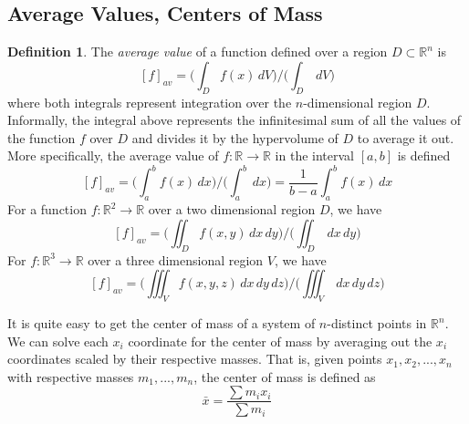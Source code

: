 \documentclass{article}
\theoremstyle{remark}
\theoremstyle{definition}
\newtheorem{definition}{Definition}[section]
\begin{document}
\subsection{Average Values, Centers of Mass}
\begin{definition}
The \textit{average value} of a function defined over a region $D \subset \mathbb{R}^n$ is 
\[[f]_{av} = \bigg(\int_D f(x) \,d V \bigg) \bigg/ \bigg( \int_D \, d V \bigg) \]
where both integrals represent integration over the $n$-dimensional region $D$. Informally, the integral above represents the infinitesimal sum of all the values of the function $f$ over $D$ and divides it by the hypervolume of $D$ to average it out. More specifically, the average value of $f: \mathbb{R} \longrightarrow \mathbb{R}$ in the interval $[a,b]$ is defined
\[ [f]_{av} = \bigg(\int_a^b f(x) \,d x \bigg) \bigg/ \bigg( \int_a^b \, d x \bigg) = \frac{1}{b-a} \int_a^b f(x) \,d x \]
For a function $f: \mathbb{R}^2 \longrightarrow \mathbb{R}$ over a two dimensional region $D$, we have 
\[[f]_{av} = \bigg(\iint_D f(x, y) \,dx\,dy \bigg) \bigg/ \bigg( \iint_D \, dx\,dy \bigg)\]
For $f: \mathbb{R}^3 \longrightarrow \mathbb{R}$ over a three dimensional region $V$, we have
\[[f]_{av} = \bigg(\iiint_V f(x, y, z) \,dx\,dy\,dz \bigg) \bigg/ \bigg( \iiint_V \, dx\,dy\,dz \bigg)\]
\end{definition}

It is quite easy to get the center of mass of a system of $n$-distinct points in $\mathbb{R}^n$. We can solve each $x_i$ coordinate for the center of mass by averaging out the $x_i$ coordinates scaled by their respective masses. That is, given points $x_1, x_2, ..., x_n$ with respective masses $m_1, ..., m_n$, the center of mass is defined as
\[\bar{x} = \frac{\sum m_i x_i}{\sum m_i}\]
\end{document}
